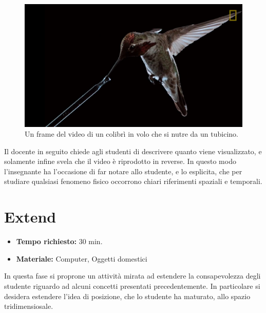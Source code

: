 \documentclass{report} \usepackage[T1]{fontenc} \usepackage[italian]{babel}
\begin{document}
\begin{figure}
\centering
  \includegraphics[width=\textwidth]{Hummingbird}
  \caption{Un frame del video di un colibrì in volo che si nutre da un tubicino.}
  \label{fig:hummingbird}
\end{figure}

Il docente in seguito chiede agli studenti di descrivere quanto viene
visualizzato, e solamente infine svela che il video è riprodotto in
reverse. In questo modo l'insegnante ha l'occasione di far notare
allo studente, e lo esplicita, che per studiare qualsiasi fenomeno fisico
occorrono chiari riferimenti spaziali e temporali.

\section{Extend}
\begin{itemize}
\item \textbf{Tempo richiesto:} 30 min.
\item \textbf{Materiale:} Computer, Oggetti domestici
\end{itemize}

In questa fase si proprone un attività mirata ad estendere la consapevolezza
degli studente riguardo ad alcuni concetti presentati precedentemente.
In particolare si desidera estendere l'idea di posizione, che lo studente ha maturato,
allo spazio tridimensiosale.
\end{document}
